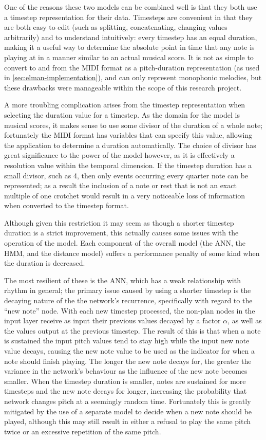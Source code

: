\documentclass[ author={Stephen Livermore-Tozer},
				supervisor={Dr. Peter Flach},
				degree={MEng},
				title={Algorithmic Co-composition Using Machine Learning},
				subtitle={},
				type={research},
				year={2016} ]{dissertation}
\begin{document}
	One of the reasons these two models can be combined well is that they both use a timestep representation for their data. Timesteps are convenient in that they are both easy to edit (such as splitting, concatenating, changing values arbitrarily) and to understand intuitively: every timestep has an equal duration, making it a useful way to determine the absolute point in time that any note is playing at in a manner similar to an actual musical score. It is not as simple to convert to and from the MIDI format as a pitch-duration representation (as used in \ref{sec:elman-implementation}), and can only represent monophonic melodies, but these drawbacks were manageable within the scope of this research project.
	
	A more troubling complication arises from the timestep representation when selecting the duration value for a timestep. As the domain for the model is musical scores, it makes sense to use some divisor of the duration of a whole note; fortunately the MIDI format has variables that can specify this value, allowing the application to determine a duration automatically. The choice of divisor has great significance to the power of the model however, as it is effectively a resolution value within the temporal dimension. If the timestep duration has a small divisor, such as 4, then only events occurring every quarter note can be represented; as a result the inclusion of a note or rest that is not an exact multiple of one crotchet would result in a very noticeable loss of information when converted to the timestep format. 
	
	
	Although given this restriction it may seem as though a shorter timestep duration is a strict improvement, this actually causes some issues with the operation of the model. Each component of the overall model (the ANN, the HMM, and the distance model) suffers a performance penalty of some kind when the duration is decreased.
	
	The most resilient of these is the ANN, which has a weak relationship with rhythm in general; the primary issue caused by using a shorter timestep is the decaying nature of the the network's recurrence, specifically with regard to the ``new note'' node. With each new timestep processed, the non-plan nodes in the input layer receive as input their previous values decayed by a factor $\alpha$, as well as the values output at the previous timestep. The result of this is that when a note is sustained the input pitch values tend to stay high while the input new note value decays, causing the new note value to be used as the indicator for when a note should finish playing. The longer the new note decays for, the greater the variance in the network's behaviour as the influence of the new note becomes smaller. When the timestep duration is smaller, notes are sustained for more timesteps and the new note decays for longer, increasing the probability that network changes pitch at a seemingly random time. Fortunately this is greatly mitigated by the use of a separate model to decide when a new note should be played, although this may still result in either a refusal to play the same pitch twice or an excessive repetition of the same pitch.
	
\end{document}
